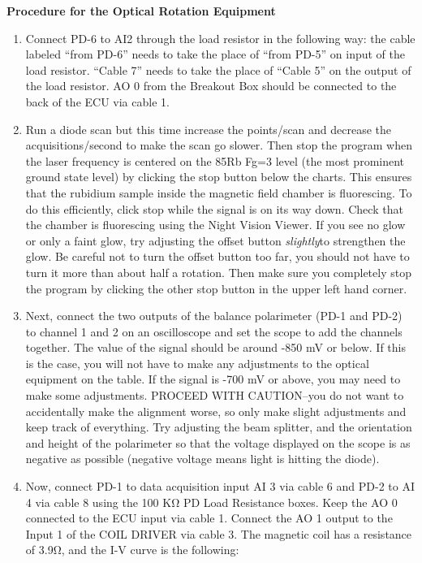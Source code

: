 \documentclass{../lab}
\begin{document}
\textbf{Procedure for the Optical Rotation Equipment}\begin{enumerate}
    \item Connect PD-6 to AI2 through the load resistor in the following way: the cable labeled ``from PD-6'' needs to take the place of ``from PD-5'' on input of the load resistor. ``Cable 7'' needs to take the place of ``Cable 5'' on the output of the load resistor. AO 0 from the Breakout Box should be connected to the back of the ECU via cable 1.

    \item Run a diode scan but this time increase the points/scan and decrease the acquisitions/second to make the scan go slower. Then stop the program when the laser frequency is centered on the 85Rb Fg=3 level (the most prominent ground state level) by clicking the stop button below the charts. This ensures that the rubidium sample inside the magnetic field chamber is fluorescing. To do this efficiently, click stop while the signal is on its way down. Check that the chamber is fluorescing using the Night Vision Viewer. If you see no glow or only a faint glow, try adjusting the offset button \emph{slightly}to strengthen the glow. Be careful not to turn the offset button too far, you should not have to turn it more than about half a rotation. Then make sure you completely stop the program by clicking the other stop button in the upper left hand corner.

    \item Next, connect the two outputs of the balance polarimeter (PD-1 and PD-2) to channel 1 and 2 on an oscilloscope and set the scope to add the channels together. The value of the signal should be around -850 mV or below. If this is the case, you will not have to make any adjustments to the optical equipment on the table. If the signal is -700 mV or above, you may need to make some adjustments. PROCEED WITH CAUTION--you do not want to accidentally make the alignment worse, so only make slight adjustments and keep track of everything. Try adjusting the beam splitter, and the orientation and height of the polarimeter so that the voltage displayed on the scope is as negative as possible (negative voltage means light is hitting the diode).

    \item Now, connect PD-1 to data acquisition input AI 3 via cable 6 and PD-2 to AI 4 via cable 8 using the 100 KΩ PD Load Resistance boxes. Keep the AO 0 connected to the ECU input via cable 1. Connect the AO 1 output to the Input 1 of the COIL DRIVER via cable 3. The magnetic coil has a resistance of 3.9Ω, and the I-V curve is the following:

\end{enumerate}
\end{document}
